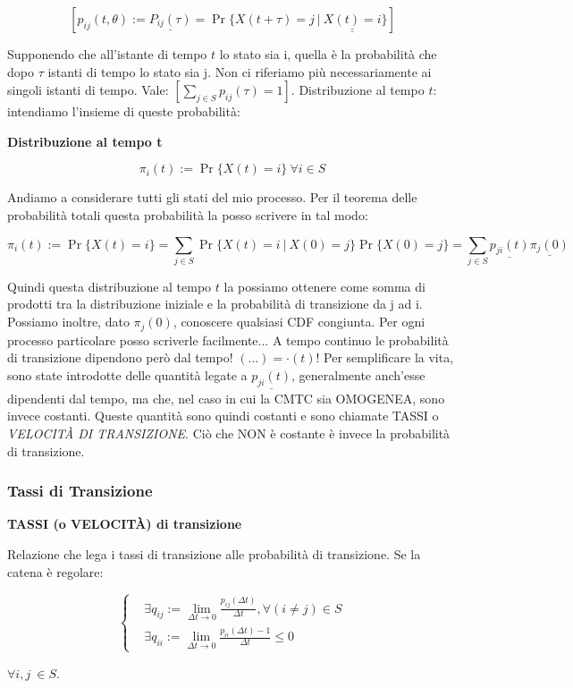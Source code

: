 \[
	[p_{ij}(t,\theta) := \underline{P_{ij}(\tau)} = \Pr\{X(t+\tau) = j\ |\ \underline{\underline{X(t) = i}}\}]
\]

Supponendo che all'istante di tempo $t$ lo stato sia i, quella è la probabilità che dopo $\tau$ istanti di tempo lo stato sia j. Non ci riferiamo più necessariamente ai singoli istanti di tempo. Vale: $[\sum_{j\in S}{p_{ij}(\tau)} = 1]$. Distribuzione al tempo $t$: intendiamo l'insieme di queste probabilità:

\begin{defn}{\textbf{Distribuzione al tempo t}}

\[
	\pi_i(t) := \Pr\{X(t) = i\}\ \forall i\in S
\]
\end{defn}

Andiamo a considerare tutti gli stati del mio processo. Per il teorema delle probabilità totali questa probabilità la posso scrivere in tal modo:

\[
	\pi_i(t) := \Pr\{X(t) = i\} = \sum_{j\in S}{\Pr\{X(t) = i\ |\ X(0) = j\}\Pr\{X(0) = j\}} = \sum_{j\in S}{\underline{p_{ji}(t)}\underline{\pi_j(0)}}
\]

Quindi questa distribuzione al tempo $t$ la possiamo ottenere come somma di prodotti tra la distribuzione iniziale e la probabilità di transizione da j ad i. Possiamo inoltre, dato $\pi_j(0)$, conoscere qualsiasi CDF congiunta. Per ogni processo particolare posso scriverle facilmente... A tempo continuo le probabilità di transizione dipendono però dal tempo! $(\dots) = \mathord{\cdot}(t)$! Per semplificare la vita, sono state introdotte delle quantità legate a $\underline{p_{ji}(t)}$, generalmente anch'esse dipendenti dal tempo, ma che, nel caso in cui la CMTC sia OMOGENEA, sono invece costanti. Queste quantità sono quindi costanti e sono chiamate TASSI o \textit{VELOCIT\`A DI TRANSIZIONE}. Ciò che NON è costante è invece la probabilità di transizione.

\subsubsection{Tassi di Transizione}

\begin{defn}{\textbf{TASSI (o VELOCIT\`A) di transizione}}

Relazione che lega i tassi di transizione alle probabilità di transizione.
Se la catena è regolare:

\[
	\left\{
	\begin{aligned}
	&\exists q_{ij} := \lim_{\Delta t\to 0}{\frac{p_{ij}(\Delta t)}{\Delta t}},	\forall (i\neq j)\in S\\
	&\exists q_{ii} := \lim_{\Delta t\to 0}{\frac{p_{ii}(\Delta t)-1}{\Delta t}} \leq 0
	\end{aligned}
	\right.
\]

$\forall i,j\ \in S$.
\end{defn}

